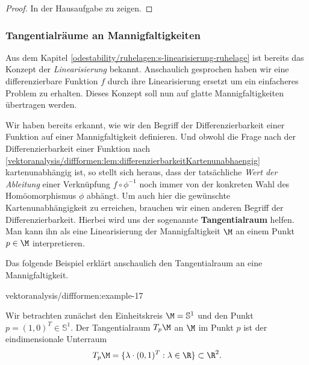 \documentclass[letterpaper,10pt,english]{jupyterBook}
\begin{document}
\begin{proof}
 In der Hausaufgabe zu zeigen.
\end{proof}


\subsubsection{Tangentialräume an Mannigfaltigkeiten}
\label{\detokenize{vektoranalysis/diffformen:tangentialraume-an-mannigfaltigkeiten}}
\par
Aus dem Kapitel \cref{odestability/ruhelagen:s-linearisierung-ruhelage}  ist bereits das Konzept der \emph{Linearisierung} bekannt.
Anschaulich gesprochen haben wir eine differenzierbare Funktion \(f\) durch ihre Linearisierung ersetzt um ein einfacheres Problem zu erhalten.
Dieses Konzept soll nun auf glatte Mannigfaltigkeiten übertragen werden.

\par
Wir haben bereits erkannt, wie wir den Begriff der Differenzierbarkeit einer Funktion auf einer Mannigfaltigkeit definieren.
Und obwohl die Frage nach der Differenzierbarkeit einer Funktion nach \cref{vektoranalysis/diffformen:lem:differenzierbarkeitKartenunabhaengig} kartenunabhängig ist, so stellt sich heraus, dass der tatsächliche \emph{Wert der Ableitung} einer Verknüpfung \(f \circ\phi^{-1}\) noch immer von der konkreten Wahl des Homöomorphismus \(\phi\) abhängt.
Um auch hier die gewünschte Kartenunabhängigkeit zu erreichen, brauchen wir einen anderen Begriff der Differenzierbarkeit.
Hierbei wird uns der sogenannte \textbf{Tangentialraum} helfen.
Man kann ihn als eine Linearisierung der Mannigfaltigkeit \(\M\) an einem Punkt \(p\in\M\) interpretieren.

\par
Das folgende Beispiel erklärt anschaulich den Tangentialraum an eine Mannigfaltigkeit.
\begin{example}{}{vektoranalysis/diffformen:example-17}



\par
Wir betrachten zunächst den Einheitskreis \(\M = \mathbb{S}^1\) und den Punkt \(p = (1, 0)^T \in \mathbb{S}^1\).
Der Tangentialraum \(T_p\M\) an \(\M\) im Punkt \(p\) ist der eindimensionale Unterraum
\begin{align*}
T_p\M = \lbrace \lambda \cdot (0, 1)^T : \lambda \in \R \rbrace \subset \R^2.
\end{align*}\end{example}
\end{document}
